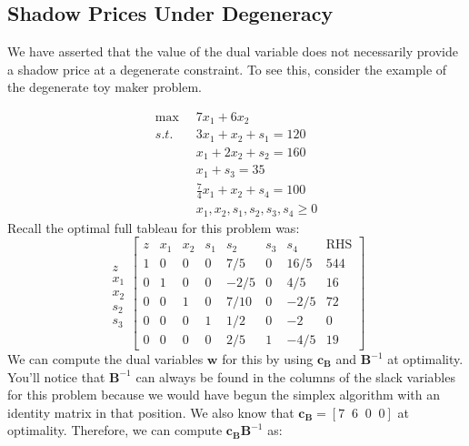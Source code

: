 \subsection*{Shadow Prices Under Degeneracy}
We have asserted that the value of the dual variable does not necessarily provide a shadow price at a degenerate constraint. To see this, consider the example of the degenerate toy maker problem.
\begin{example}
\begin{displaymath}
\begin{aligned}
\max\;\;&7x_1 + 6x_2\\
s.t.\;\;&3x_1 + x_2 +s_1 = 120\\
&x_1 + 2x_2 + s_2 = 160\\
&x_1 + s_3 = 35\\
&\frac{7}{4}x_1+x_2 + s_4 = 100\\
&x_1,x_2,s_1,s_2,s_3,s_4 \geq 0
\end{aligned}
\end{displaymath}
Recall the optimal full tableau for this problem was:
\begin{displaymath}
\begin{array}{c}
\\
z\\
x_1\\
x_2\\
s_2\\
s_3
\end{array}
\left[
\begin{array}{c|cccccc|c}
z& x_1 & x_2 & s_1 & s_2 & s_3 & s_4 &\text{RHS}\\
\hline
1 & 0 & 0 & 0 & 7/5 	& 0 & 16/5 & 544\\
\hline
0 & 1 & 0 & 0 & -2/5 		& 0  & 4/5 		& 16\\
0 & 0 & 1 & 0 & 7/10 		& 0  & -2/5 	& 72\\
0 & 0 & 0 & 1 & 1/2 		& 0  & -2 		& 0\\
0 & 0 & 0 & 0 & 2/5 		& 1  & -4/5 	& 19
\end{array}\right]
\end{displaymath}
We can compute the dual variables $\mathbf{w}$ for this by using $\mathbf{c}_\mathbf{B}$ and $\mathbf{B}^{-1}$ at optimality. You'll notice that $\mathbf{B}^{-1}$ can always be found in the columns of the slack variables for this problem because we would have begun the simplex algorithm with an identity matrix in that position. We also know that $\mathbf{c}_\mathbf{B} = [7\;\;6\;\;0\;\;0]$ at optimality. Therefore, we can compute $\mathbf{c}_\mathbf{B}\mathbf{B}^{-1}$ as:

\end{example}
